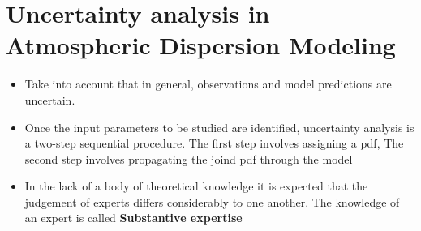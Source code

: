 \documentclass[12pt]{article}
\begin{document}
\newpage
\section*{Uncertainty analysis in Atmospheric Dispersion Modeling}
\begin{itemize}
\item Take into account that in general, observations and model predictions
are uncertain.
\item Once the input parameters to be studied are identified, uncertainty analysis is a two-step sequential procedure.
The first step involves assigning a pdf, The second step involves propagating the joind pdf through the model
\item In the lack of a body of theoretical knowledge it is expected that the judgement of experts
differs considerably to one another. The knowledge of an expert is called \textbf{Substantive expertise}
\end{itemize}
\end{document}
